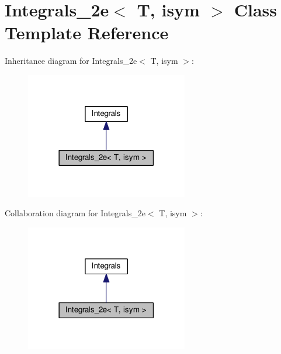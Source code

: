 \hypertarget{classIntegrals__2e}{}\section{Integrals\+\_\+2e$<$ T, isym $>$ Class Template Reference}
\label{classIntegrals__2e}


Inheritance diagram for Integrals\+\_\+2e$<$ T, isym $>$\+:
\nopagebreak
\begin{figure}[H]
\begin{center}
\leavevmode
\includegraphics[width=201pt]{classIntegrals__2e__inherit__graph}
\end{center}
\end{figure}


Collaboration diagram for Integrals\+\_\+2e$<$ T, isym $>$\+:
\nopagebreak
\begin{figure}[H]
\begin{center}
\leavevmode
\includegraphics[width=201pt]{classIntegrals__2e__coll__graph}
\end{center}
\end{figure}
